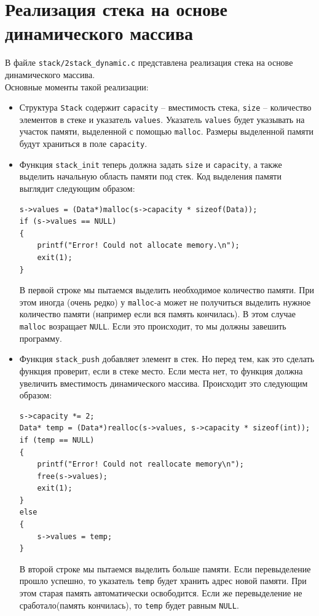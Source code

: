 \documentclass{article}
\begin{document}
\newpage
\section*{Реализация стека на основе динамического массива}
В файле \texttt{stack/2stack\_dynamic.c} представлена реализация стека на основе динамического массива.\\ 
Основные моменты такой реализации:
\begin{itemize}
\item Структура \texttt{Stack} содержит \texttt{capacity} -- вместимость стека, \texttt{size} -- количество элементов в стеке и указатель \texttt{values}. Указатель \texttt{values} будет указывать на участок памяти, выделенной с помощью \texttt{malloc}. Размеры выделенной памяти будут храниться в поле \texttt{capacity}.
\item Функция \texttt{stack\_init} теперь должна задать \texttt{size} и \texttt{capacity}, а также выделить начальную область памяти под стек. Код выделения
памяти выглядит следующим образом:
\begin{lstlisting}
s->values = (Data*)malloc(s->capacity * sizeof(Data));
if (s->values == NULL)
{
	printf("Error! Could not allocate memory.\n");
	exit(1);
}
\end{lstlisting}
В первой строке мы пытаемся выделить необходимое количество памяти. При этом иногда (очень редко) у \texttt{malloc}-а может не получиться выделить нужное количество памяти (например если вся память кончилась). В этом случае \texttt{malloc} возращает \texttt{NULL}. Если это происходит, то мы должны завешить программу.
\item Функция \texttt{stack\_push} добавляет элемент в стек. Но перед тем, как это сделать функция проверит, если в стеке место. Если места нет, то функция должна увеличить вместимость динамического массива. Происходит это следующим образом:
\begin{lstlisting}
s->capacity *= 2;
Data* temp = (Data*)realloc(s->values, s->capacity * sizeof(int));
if (temp == NULL)
{
	printf("Error! Could not reallocate memory\n");
	free(s->values);
	exit(1);
}
else
{
	s->values = temp;
}
\end{lstlisting}
В второй строке мы пытаемся выделить больше памяти. Если перевыделение прошло успешно, то указатель \texttt{temp} будет хранить адрес новой памяти. При этом старая память автоматически освободится. Если же перевыделение не сработало(память кончилась), то \texttt{temp} будет равным \texttt{NULL}.
\end{itemize}
\end{document}
